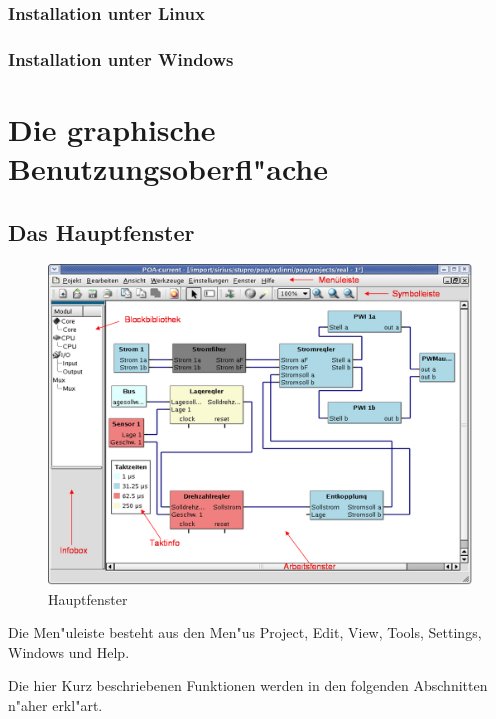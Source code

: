 \documentclass[a4paper,titlepage,12pt,ngerman]{scrbook}
\begin{document}
\subsection{Installation unter Linux}
	
\subsection{Installation unter Windows}


	
\chapter{Die graphische Benutzungsoberfl"ache}

\section{Das Hauptfenster}
\begin{figure}[htbp]

\begin{center}

\includegraphics[width=15cm]{Mainwindow1}

\caption{Hauptfenster}\label{test}

\end{center}

\end{figure}

Die Men"uleiste besteht aus den Men"us Project, Edit, View, Tools, Settings, Windows und Help.\par
\newpage
Die hier Kurz beschriebenen Funktionen werden in den folgenden Abschnitten n"aher erkl"art.\par
\end{document}
